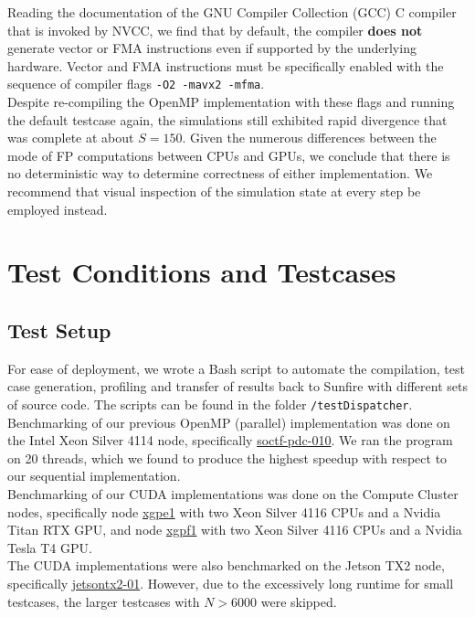 \documentclass[12pt]{article}
\begin{document}
Reading the documentation of the GNU Compiler Collection (GCC) C compiler that is invoked by NVCC, we find that by default, the compiler \textbf{does not} generate vector or FMA instructions even if supported by the underlying hardware. Vector and FMA instructions must be specifically enabled with the sequence of compiler flags \texttt{-O2 -mavx2 -mfma}.\\

Despite re-compiling the OpenMP implementation with these flags and running the default testcase again, the simulations still exhibited rapid divergence that was complete at about $S = 150$. Given the numerous differences between the mode of FP computations between CPUs and GPUs, we conclude that there is no deterministic way to determine correctness of either implementation. We recommend that visual inspection of the simulation state at every step be employed instead.

\pagebreak

\section{Test Conditions and Testcases}

\subsection{Test Setup}

For ease of deployment, we wrote a Bash script to automate the compilation, test case generation, profiling and transfer of results back to Sunfire with different sets of source code. The scripts can be found in the folder \texttt{/testDispatcher}.\\

Benchmarking of our previous OpenMP (parallel) implementation was done on the Intel Xeon Silver 4114 node, specifically \ul{soctf-pdc-010}. We ran the program on 20 threads, which we found to produce the highest speedup with respect to our sequential implementation. \cite{assignref}\\

Benchmarking of our CUDA implementations was done on the Compute Cluster nodes, specifically node \ul{xgpe1} with two Xeon Silver 4116 CPUs and a Nvidia Titan RTX GPU, and node \ul{xgpf1} with two Xeon Silver 4116 CPUs and a Nvidia Tesla T4 GPU.\\

The CUDA implementations were also benchmarked on the Jetson TX2 node, specifically \ul{jetsontx2-01}. However, due to the excessively long runtime for small testcases, the larger testcases with $N > 6000$ were skipped.\\
\end{document}
